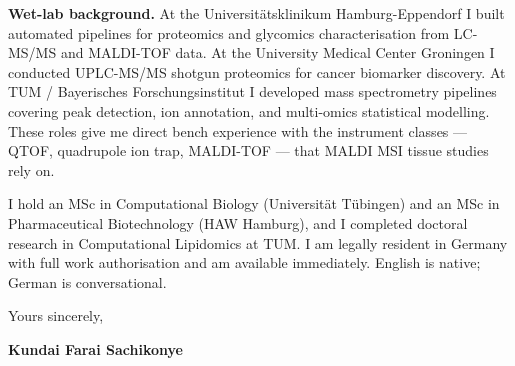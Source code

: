 \documentclass[12pt,a4paper]{article}
\begin{document}
\textbf{Wet-lab background.}
At the Universitätsklinikum Hamburg-Eppendorf I built automated pipelines for
proteomics and glycomics characterisation from LC-MS/MS and MALDI-TOF data.
At the University Medical Center Groningen I conducted UPLC-MS/MS shotgun
proteomics for cancer biomarker discovery.
At TUM / Bayerisches Forschungsinstitut I developed mass spectrometry pipelines
covering peak detection, ion annotation, and multi-omics statistical modelling.
These roles give me direct bench experience with the instrument classes
--- QTOF, quadrupole ion trap, MALDI-TOF --- that MALDI MSI tissue studies rely on.

I hold an MSc in Computational Biology (Universität Tübingen) and an MSc in
Pharmaceutical Biotechnology (HAW Hamburg), and I completed doctoral research in
Computational Lipidomics at TUM. I am legally resident in Germany with full work
authorisation and am available immediately. English is native; German is
conversational.

\vspace{1.5em}
Yours sincerely,

\vspace{2.5em}
\textbf{Kundai Farai Sachikonye}
\end{document}
